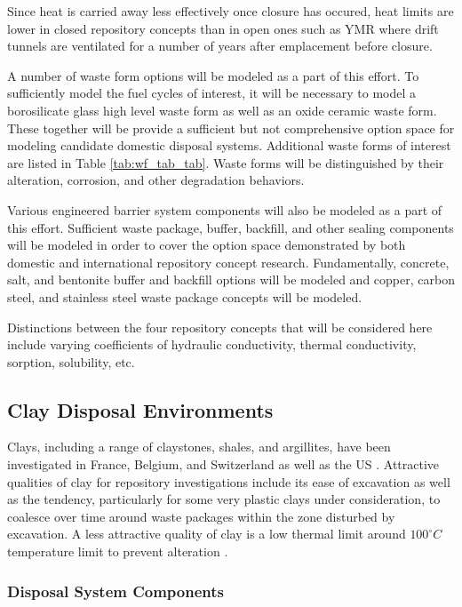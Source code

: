 {Since heat is carried away less effectively once closure 
has occured, heat limits are lower in  closed repository concepts than in open 
ones such as \gls{YMR} where drift tunnels are ventilated for a number of years
after emplacement before closure.

A number of waste form options will be modeled as a part of this effort. To 
sufficiently model the fuel cycles of interest, it will be necessary to model 
a borosilicate glass high level waste form as well as an oxide ceramic waste 
form. These together will be provide a sufficient but not comprehensive option 
space for modeling candidate domestic disposal systems. Additional waste forms 
of interest are listed in Table \ref{tab:wf_tab_tab}. Waste forms will be 
distinguished by their alteration, corrosion, and other degradation behaviors.

Various engineered barrier system components will also be modeled as a part of 
this effort. Sufficient waste package, buffer, backfill, and other sealing 
components will be modeled in order to cover the option space demonstrated by 
both domestic and international repository concept research. Fundamentally, 
concrete, salt, and bentonite buffer and backfill options will be modeled and 
copper, carbon steel, and stainless steel waste package concepts will be 
modeled.

Distinctions between the four repository concepts that will be considered here 
include varying coefficients of hydraulic conductivity, thermal conductivity, 
sorption, solubility, etc.

\subsection{Clay Disposal Environments}

Clays, including a range of claystones, shales, and argillites, have been 
investigated in France, Belgium, and Switzerland as well as the  \gls{US} 
\cite{von_lensa_red-impact_2008, clayton_generic_2011}. Attractive qualities 
of clay for repository investigations include its ease of excavation as well as
the tendency, particularly for some very plastic clays under consideration, to 
coalesce over time around waste packages within the zone disturbed by 
excavation.  A less attractive quality of clay is a 
low thermal limit around $100^{\circ}C$ temperature limit to prevent alteration 
\cite{hardin_generic_2011}.



\subsubsection{Disposal System Components}

}
